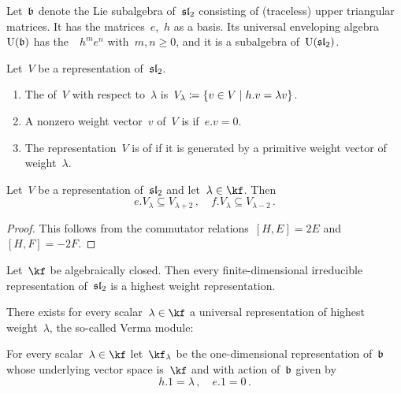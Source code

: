 \documentclass[a4paper, 11pt, oneside]{scrartcl}
\begin{document}

Let~$\mathfrak{b}$ denote the Lie subalgebra of~$\mathfrak{sl}_2$ consisting of (traceless) upper triangular matrices.
It has the matrices~$e$,~$h$ as a basis.
Its universal enveloping algebra~$\operatorname{U}(\mathfrak{b})$ has the~{\PBWbasis}~$h^m e^n$ with~$m, n \geq 0$, and it is a subalgebra of~$\operatorname{U}(\mathfrak{sl}_2)$.

\begin{definition}
  Let~$V$ be a representation of~$\mathfrak{sl}_2$.
  \begin{enumerate}
    \item
      The  of~$V$ with respect to~$\lambda$ is~$V_\lambda \defined \{ v \in V \suchthat h.v = \lambda v \}$.
    \item
      A nonzero weight vector~$v$ of~$V$ is  if~$e.v = 0$.
    \item
      The representation~$V$ is of  if it is generated by a primitive weight vector of weight~$\lambda$.
  \end{enumerate}
\end{definition}

\begin{proposition}
  \label{shifting lemma}
  Let~$V$ be a representation of~$\mathfrak{sl}_2$ and let~$\lambda \in \kf$.
  Then
  \[
    e.V_\lambda
    \subseteq
    V_{\lambda + 2} \,,
    \quad
    f.V_\lambda
    \subseteq
    V_{\lambda - 2} \,.
  \]
\end{proposition}

\begin{proof}
  This follows from the commutator relations~$[H,E] = 2E$ and~$[H,F] = -2F$.
\end{proof}

\begin{lemma}
  Let~$\kf$ be algebraically closed.
  Then every finite-dimensional irreducible representation of~$\mathfrak{sl}_2$ is a highest weight representation.
\end{lemma}

There exists for every scalar~$\lambda \in \kf$ a universal representation of highest weight~$\lambda$, the so-called Verma module: 

\begin{definition}
  For every scalar~$\lambda \in \kf$ let~$\kf_\lambda$ be the one-dimensional representation of~$\mathfrak{b}$ whose underlying vector space is~$\kf$ and with action of~$\mathfrak{b}$ given by
  \[
    h.1 = \lambda \,,
    \quad
    e.1 = 0 \,.
  \]
\end{definition}
\end{document}
